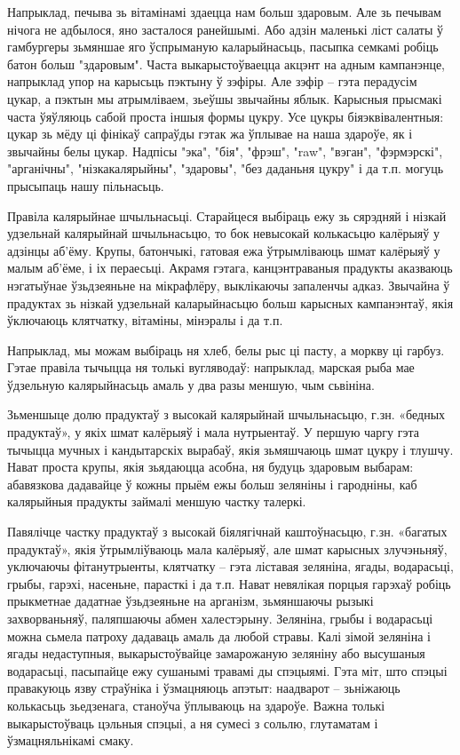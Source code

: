 Напрыклад, печыва зь вітамінамі здаецца нам больш здаровым. Але зь печывам нічога не адбылося, яно засталося ранейшымі. Або адзін маленькі ліст салаты ў гамбургеры зьмяншае яго ўспрыманую каларыйнасьць, пасыпка семкамі робіць батон больш "здаровым". Часта выкарыстоўваецца акцэнт на адным кампанэнце, напрыклад упор на карысьць пэктыну ў зэфіры. Але зэфір – гэта перадусім цукар, а пэктын мы атрымліваем, зьеўшы звычайны яблык. Карысныя прысмакі часта ўяўляюць сабой проста іншыя формы цукру. Усе цукры біяэквівалентныя: цукар зь мёду ці фінікаў сапраўды гэтак жа ўплывае на наша здароўе, як і звычайны белы цукар. Надпісы "эка", "бія", "фрэш", "raw", "вэган", "фэрмэрскі", "арганічны", "нізкакалярыйны", "здаровы", "без даданьня цукру" і да т.п. могуць прысыпаць нашу пільнасьць.

Правіла калярыйнае шчыльнасьці. Старайцеся выбіраць ежу зь сярэдняй і нізкай удзельнай калярыйнай шчыльнасьцю, то бок невысокай колькасьцю калёрыяў у адзінцы аб'ёму. Крупы, батончыкі, гатовая ежа ўтрымліваюць шмат калёрыяў у малым аб'ёме, і іх пераесьці. Акрамя гэтага, канцэнтраваныя прадукты аказваюць нэгатыўнае ўзьдзеяньне на мікрафлёру, выклікаючы запаленчы адказ. Звычайна ў прадуктах зь нізкай удзельнай каларыйнасьцю больш карысных кампанэнтаў, якія ўключаюць клятчатку, вітаміны, мінэралы і да т.п.

Напрыклад, мы можам выбіраць ня хлеб, белы рыс ці пасту, а моркву ці гарбуз. Гэтае правіла тычыцца ня толькі вугляводаў: напрыклад, марская рыба мае ўдзельную калярыйнасьць амаль у два разы меншую, чым сьвініна.

Зьменшыце долю прадуктаў з высокай калярыйнай шчыльнасьцю, г.зн. «бедных прадуктаў», у якіх шмат калёрыяў і мала нутрыентаў. У першую чаргу гэта тычыцца мучных і кандытарскіх вырабаў, якія зьмяшчаюць шмат цукру і тлушчу. Нават проста крупы, якія зьядаюцца асобна, ня будуць здаровым выбарам: абавязкова дадавайце ў кожны прыём ежы больш зеляніны і гародніны, каб калярыйныя прадукты займалі меншую частку талеркі.

Павялічце частку прадуктаў з высокай біялягічнай каштоўнасьцю, г.зн. «багатых прадуктаў», якія ўтрымліўваюць мала калёрыяў, але шмат карысных злучэньняў, уключаючы фітанутрыенты, клятчатку – гэта ліставая зеляніна, ягады, водарасьці, грыбы, гарэхі, насеньне, парасткі і да т.п. Нават невялікая порцыя гарэхаў робіць прыкметнае дадатнае ўзьдзеяньне на арганізм, зьмяншаючы рызыкі захворваньняў, паляпшаючы абмен халестэрыну. Зеляніна, грыбы і водарасьці можна сьмела патроху дадаваць амаль да любой стравы. Калі зімой зеляніна і ягады недаступныя, выкарыстоўвайце замарожаную зеляніну або высушаныя водарасьці, пасыпайце ежу сушанымі травамі ды спэцыямі. Гэта міт, што спэцыі правакуюць язву страўніка і ўзмацняюць апэтыт: наадварот – зьніжаюць колькасьць зьедзенага, станоўча ўплываюць на здароўе. Важна толькі выкарыстоўваць цэльныя спэцыі, а ня сумесі з сольлю, глутаматам і ўзмацняльнікамі смаку.

